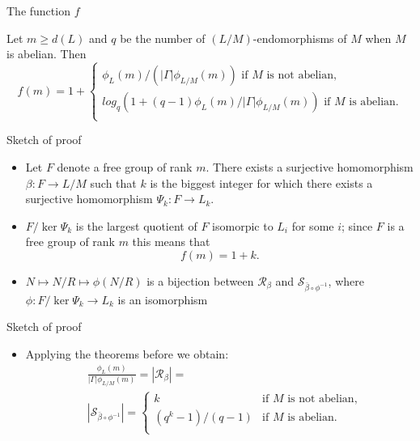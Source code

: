 \documentclass{beamer}
\newcommand{\card}[1]{| #1 |}
\begin{document}
\begin{frame}{The function $f$}
    \begin{theorem}
        Let $m \ge d(L)$ and $q$ be the number of $(L/M)$-endomorphisms of $M$ when $M$ is abelian. Then 
        $$
        f(m) = 1 +
        \begin{cases}
            \phi_L(m)/(\card{\Gamma}\phi_{L/M}(m))  \text{ if } M \text{ is not abelian,} \\
            log_q(1+(q-1)\phi_L(m)/\card{\Gamma}\phi_{L/M}(m))  \text{ if } M \text{ is abelian.} \\
        \end{cases}
        $$
    \end{theorem}
\end{frame}

\begin{frame}{Sketch of proof}
    \begin{itemize}
        \item Let $F$ denote a free group of rank $m$. There exists a surjective homomorphism $\beta \colon F \rightarrow L/M$ such that $k$ is the biggest integer for which there exists a surjective homomorphism $\Psi_k \colon F \rightarrow L_k$.
        \item<2-> $F/\ker{\Psi_k}$ is the largest quotient of $F$ isomorpic to $L_i$ for some $i$; since $F$ is a free group of rank $m$ this means that 
        $$
        f(m) = 1 + k.
        $$
        \item<3-> $N \mapsto N/R \mapsto \phi(N/R)$ is a bijection between $\mathscr{R}_\beta$ and $\mathscr{S}_{\bar{\beta} \circ \phi^{-1}}$, where $\phi \colon F/\ker{\Psi_k} \rightarrow L_k$ is an isomorphism
    \end{itemize}
\end{frame}

\begin{frame}{Sketch of proof}
    \begin{itemize}
        \item Applying the theorems before we obtain:
        \begin{align*}
            &\frac{\phi_L(m)}{\card{\Gamma}\phi_{L/M}(m)} = \card{\mathscr{R}_\beta} = \\
            & \card{\mathscr{S}_{\bar{\beta} \circ \phi^{-1}}} = 
        \begin{cases}
            k & \text{if } M \text{ is not abelian,} \\
            (q^k-1)/(q-1) & \text{if } M \text{ is abelian.} \\
        \end{cases}
        \end{align*}
    \end{itemize}
\end{frame}
\end{document}
